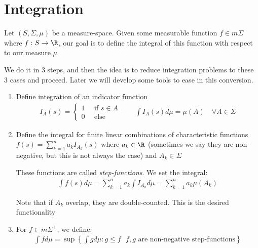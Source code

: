 \section{Integration}
\noindent Let $(S,\Sigma, \mu)$ be a measure-space. Given some measurable function $f\in m\Sigma$ where $f:S\to\R$, our goal is to define the integral of this function with respect to our measure $\mu$\par
\noindent We do it in 3 steps, and then the idea is to reduce integration problems to these 3 cases and proceed. Later we will develop some tools to ease in this conversion.
\par\bigskip
\begin{enumerate}[leftmargin=*]
  \item Define integration of an indicator function 
    \begin{equation*}
      \begin{gathered}
        I_A(s) = \begin{cases}1\quad\text{ if } s\in A\\0\quad\text{ else}\end{cases}\qquad \int I_A(s)d\mu = \mu(A)\quad\forall A\in\Sigma
      \end{gathered}
    \end{equation*}
    \par\bigskip
  \item Define the integral for finite linear combinations of characteristic functions $f(s) = \sum_{k=1}^{n}a_kI_{A_k}(s)$ where $a_k\in\R$ (sometimes we say they are non-negative, but this is not always the case) and $A_k\in\Sigma$\par
    \noindent These functions are called \textit{step-functions}. We set the integral:
    \begin{equation*}
      \begin{gathered}
        \int f(s)d\mu = \sum_{k=1}^{n}a_k\int I_{A_k}d\mu = \sum_{k=1}^{n}a_k\mu(A_k)
      \end{gathered}
    \end{equation*}\par
    \noindent Note that if $A_k$  overlap, they are double-counted. This is the desired functionality
    \par\bigskip
  \item For $f\in m\Sigma^+$, we define:
    \begin{equation*}
      \begin{gathered}
        \int f d\mu = \sup\left\{\int gd\mu:g\leq f\text{ $f,g$ are non-negative step-functions}\right\}

\end{gathered}
\end{equation*}
\end{enumerate}

